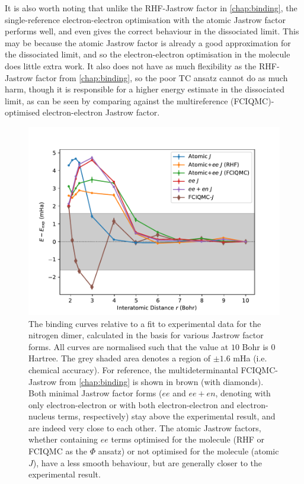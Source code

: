 It is also worth noting that unlike the RHF-Jastrow factor in \autoref{chap:binding}, the single-reference electron-electron optimisation with the atomic Jastrow factor performs well, and even gives the correct behaviour in the dissociated limit. This may be because the atomic Jastrow factor is already a good approximation for the dissociated limit, and so the electron-electron optimisation in the molecule does little extra work. It also does not have as much flexibility as the RHF-Jastrow factor from \autoref{chap:binding}, so the poor TC ansatz cannot do as much harm, though it is responsible for a higher energy estimate in the dissociated limit, as can be seen by comparing against the multireference (FCIQMC)-optimised electron-electron Jastrow factor.

\begin{figure}[htbp]
    \centering
    \includegraphics[width=\textwidth]{figures/universal/residuals}
    \caption{The binding curves relative to a fit to experimental data\supercite{leroyAccurate2006} for the nitrogen dimer, calculated in the \avtz basis for various Jastrow factor forms. All curves are normalised such that the value at $10$ Bohr is $0$ Hartree. The grey shaded area denotes a region of $\pm 1.6$ mHa (i.e. chemical accuracy). For reference, the multideterminantal FCIQMC-Jastrow from \autoref{chap:binding} is shown in brown (with diamonds). Both minimal Jastrow factor forms ($ee$ and $ee+en$, denoting with only electron-electron or with both electron-electron and electron-nucleus terms, respectively) stay above the experimental result, and are indeed very close to each other. The atomic Jastrow factors, whether containing $ee$ terms optimised for the molecule (RHF or FCIQMC as the $\Phi$ ansatz) or not optimised for the molecule (atomic $J$), have a less smooth behaviour, but are generally closer to the experimental result.
    }
    \label{fig:binding-universal-experiment}
\end{figure}

